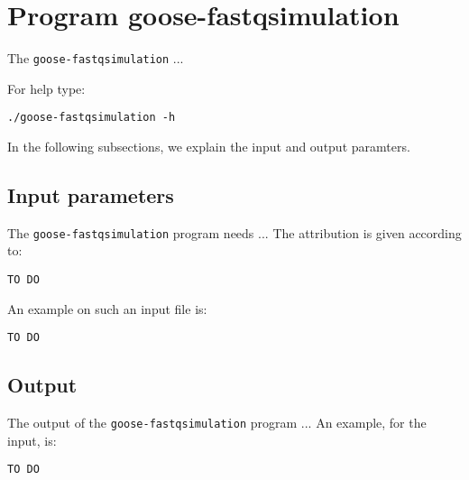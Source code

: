 \section{Program goose-fastqsimulation}
The \texttt{goose-fastqsimulation} ...

For help type:
\begin{lstlisting}
./goose-fastqsimulation -h
\end{lstlisting}
In the following subsections, we explain the input and output paramters.

\subsection*{Input parameters}

The \texttt{goose-fastqsimulation} program needs ...
The attribution is given according to:
\begin{lstlisting}
TO DO
\end{lstlisting}

An example on such an input file is:
\begin{lstlisting}
TO DO
\end{lstlisting}

\subsection*{Output}
The output of the \texttt{goose-fastqsimulation} program ...
An example, for the input, is:
\begin{lstlisting}
TO DO
\end{lstlisting}
